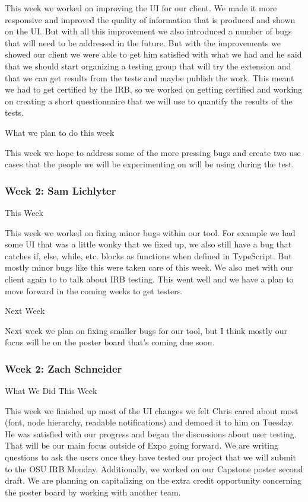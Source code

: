 This week we worked on improving the UI for our client. We made it more responsive and improved the quality of information that is produced and shown on the UI. But with all this improvement we also introduced a number of bugs that will need to be addressed in the future. But with the improvements we showed our client we were able to get him satisfied with what we had and he said that we should start organizing a testing group that will try the extension and that we can get results from the tests and maybe publish the work. This meant we had to get certified by the IRB, so we worked on getting certified and working on creating a short questionnaire that we will use to quantify the results of the tests.



What we plan to do this week



This week we hope to address some of the more pressing bugs and create two use cases that the people we will be experimenting on will be using during the test.  \\ 

 \subsubsection{Week 2: Sam Lichlyter}

This Week 

This week we worked on fixing minor bugs within our tool. For example we had some UI that was a little wonky that we fixed up, we also still have a bug that catches if, else, while, etc. blocks as functions when defined in TypeScript. But mostly minor bugs like this were taken care of this week. We also met with our client again to to talk about IRB testing. This went well and we have a plan to move forward in the coming weeks to get testers.



Next Week

Next week we plan on fixing smaller bugs for our tool, but I think mostly our focus will be on the poster board that's coming due soon. \\ 

 \subsubsection{Week 2: Zach Schneider}

What We Did This Week

This week we finished up most of the UI changes we felt Chris cared about most (font, node hierarchy, readable notifications) and demoed it to him on Tuesday. He was satisfied with our progress and began the discussions about user testing. That will be our main focus outside of Expo going forward. We are writing questions to ask the users once they have tested our project that we will submit to the OSU IRB Monday. Additionally, we worked on our Capstone poster second draft. We are planning on capitalizing on the extra credit opportunity concerning the poster board by working with another team.



